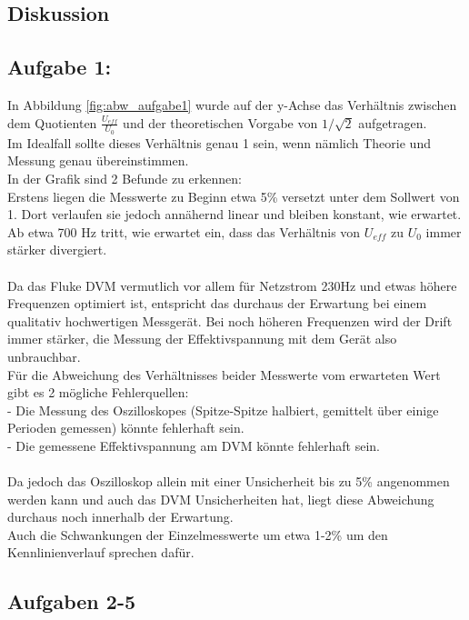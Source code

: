 \documentclass[12pt,a4paper]{article}
\begin{document}
\begin{multicols}{2}


\section{Diskussion}
\subsection{Aufgabe 1:}
In Abbildung \ref{fig:abw_aufgabe1} wurde auf der y-Achse das Verhältnis zwischen dem Quotienten $\frac{U_{eff}}{U_0}$ und der theoretischen Vorgabe von $1/\sqrt{2}$ aufgetragen.\\
Im Idealfall sollte dieses Verhältnis genau 1 sein, wenn nämlich Theorie und Messung genau übereinstimmen.\\
In der Grafik sind 2 Befunde zu erkennen:\\
Erstens liegen die Messwerte zu Beginn etwa 5\% versetzt unter dem Sollwert von 1. Dort verlaufen sie jedoch annähernd linear und bleiben konstant, wie erwartet.\\
Ab etwa 700 Hz tritt, wie erwartet ein, dass das Verhältnis von $U_{eff}$ zu $U_0$ immer stärker divergiert.\\
\\
Da das Fluke DVM vermutlich vor allem für Netzstrom 230Hz und etwas höhere Frequenzen optimiert ist, entspricht das durchaus der Erwartung bei einem qualitativ hochwertigen Messgerät. Bei noch höheren Frequenzen wird der Drift immer stärker, die Messung der Effektivspannung mit dem Gerät also unbrauchbar.\\
Für die Abweichung des Verhältnisses beider Messwerte vom erwarteten Wert gibt es 2 mögliche Fehlerquellen:\\
- Die Messung des Oszilloskopes (Spitze-Spitze halbiert, gemittelt über einige Perioden gemessen) könnte fehlerhaft sein.\\
- Die gemessene Effektivspannung am DVM könnte fehlerhaft sein.\\
\\
Da jedoch das Oszilloskop allein mit einer Unsicherheit bis zu 5\% angenommen werden kann und auch das DVM Unsicherheiten hat, liegt diese Abweichung durchaus noch innerhalb der Erwartung.\\
Auch die Schwankungen der Einzelmesswerte um etwa 1-2\% um den Kennlinienverlauf sprechen dafür.

\subsection{Aufgaben 2-5}


\end{multicols}
\end{document}
